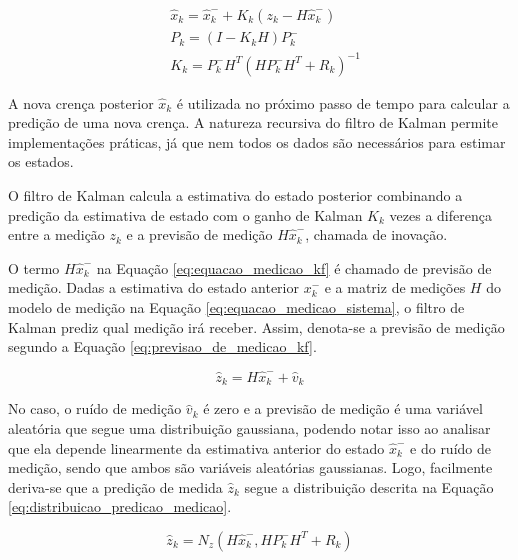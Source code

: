 \documentclass[acronym, symbols, table]{fei}
\begin{document}
				\begin{equation} \label{eq:equacao_medicao_kf}
					\begin{split}
						&\hat{x}_{k} = \hat{x}_{k}^{-} + K_{k}(z_k - H\hat{x}_{k}^{-}) \\
						&P_{k} = (I - K_kH)P_{k}^{-} \\
						&K_k =  P_{k}^{-}H^T(HP_{k}^{-}H^T + R_k)^{-1}
					\end{split}
				\end{equation}
			
				A nova crença posterior $\hat{x}_{k}$ é utilizada no próximo passo de tempo para calcular a predição de uma nova crença. A natureza recursiva do filtro de Kalman permite implementações práticas, já que nem todos os dados são necessários para estimar os estados.
				
				O filtro de Kalman calcula a estimativa do estado posterior combinando a predição da estimativa de estado com o ganho de Kalman $K_k$ vezes a diferença entre a medição $z_k$ e a previsão de medição $H\hat{x}_{k}^{-}$, chamada de inovação.
				
				O termo $H\hat{x}_{k}^{-}$ na Equação \eqref{eq:equacao_medicao_kf} é chamado de previsão de medição. Dadas a estimativa do estado anterior ${x}_{k}^{-}$ e a matriz de medições $H$ do modelo de medição na Equação \eqref{eq:equacao_medicao_sistema}, o filtro de Kalman prediz qual medição irá receber. Assim, denota-se a previsão de medição segundo a Equação \eqref{eq:previsao_de_medicao_kf}.
				
				\begin{equation} \label{eq:previsao_de_medicao_kf}
					\hat{z}_k = H\hat{x}_{k}^{-} + \hat{v}_k
				\end{equation}
			
				No caso, o ruído de medição $\hat{v}_k$ é zero e a previsão de medição é uma variável aleatória que segue uma distribuição gaussiana, podendo notar isso ao analisar que ela depende linearmente da estimativa anterior do estado $\hat{x}_{k}^{-}$ e do ruído de medição, sendo que ambos são variáveis aleatórias gaussianas. Logo, facilmente deriva-se que a predição de medida $\hat{z}_k$ segue a distribuição descrita na Equação \eqref{eq:distribuicao_predicao_medicao}.
				
				\begin{equation} \label{eq:distribuicao_predicao_medicao}
					\hat{z}_k = N_z( H\hat{x}_{k}^{-}, HP_{k}^{-}H^T + R_k)
				\end{equation}
			
\end{document}
